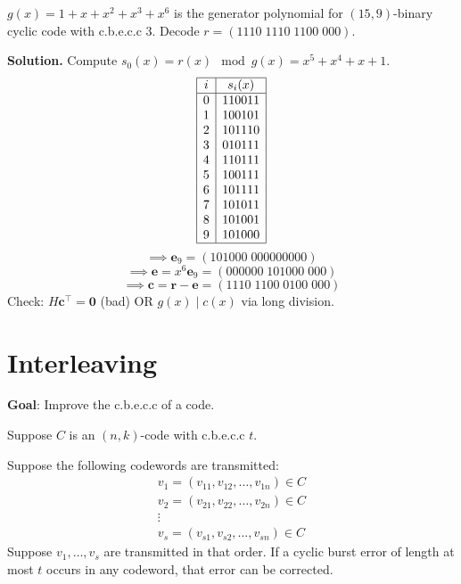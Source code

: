 \begin{exbox}
    \begin{example}
        $ g(x)=1+x+x^2+x^3+x^6 $ is the generator polynomial for $ (15,9) $-binary
        cyclic code with c.b.e.c.c $ 3 $. Decode $ r=(1110\; 1110\; 1100\; 000) $.

        \textbf{Solution.}
        Compute $ s_0(x)=r(x)\mod g(x)=x^5+x^4+x+1 $.
        \[ \begin{array}{|c|c|}
                \hline
                i & s_i(x) \\
                \hline
                0 & 110011 \\
                1 & 100101 \\
                2 & 101110 \\
                3 & 010111 \\
                4 & 110111 \\
                5 & 100111 \\
                6 & 101111 \\
                7 & 101011 \\
                8 & 101001 \\
                9 & 101000 \\
                \hline
            \end{array} \]
        \[ \implies \bm{e}_9=(101000\; 000000000) \]
        \[ \implies \bm{e}=x^6 \bm{e}_9=(000000\; 101000\;000 ) \]
        \[ \implies \bm{c}=\bm{r}-\bm{e}=(1110\;1100\;0100\;000) \]
        Check: $ H\bm{c}^\top=\bm{0} $ (bad) OR $ g(x)\mid c(x) $ via long division.
    \end{example}
\end{exbox}

\section{Interleaving}
\textbf{Goal}: Improve the c.b.e.c.c of a code.

Suppose $ C $ is an $ (n,k) $-code with c.b.e.c.c $ t $.

Suppose the following codewords are transmitted:
\[ \begin{array}{c}
        v_1=(v_{11},v_{12},\ldots ,v_{1n})\in C \\
        v_2=(v_{21},v_{22},\ldots ,v_{2n})\in C \\
        \vdots                                  \\
        v_s=(v_{s1},v_{s2},\ldots ,v_{sn})\in C
    \end{array} \]
Suppose $ v_1,\ldots ,v_s $ are transmitted in that order. If a cyclic burst error
of length at most $ t $ occurs in any codeword, that error can be corrected.

